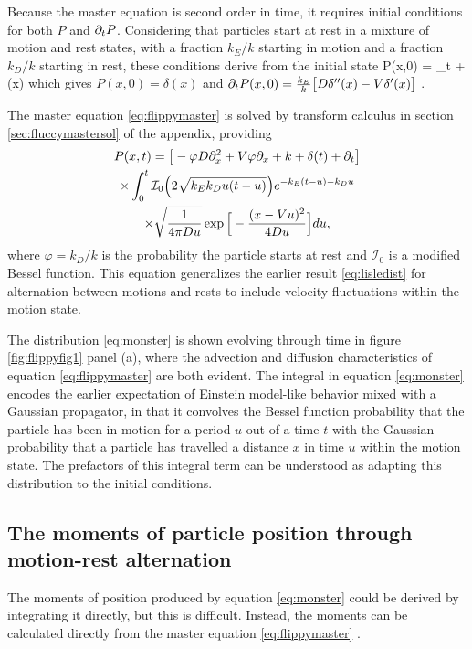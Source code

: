Because the master equation is second order in time, it requires initial conditions for both $P$ and $\partial_t P$. Considering that particles start at rest in a mixture of motion and rest states, with a fraction $k_E/k$ starting in motion and a fraction $k_D/k$ starting in rest, these conditions derive from the initial state 
\be P(x,0) = \lim_{t }   \exp{}+ \delta(x)\ee
which gives $P(x,0) = \delta(x)$ and $ \partial_t P(x,0) = \frac{k_E}{k}\big[D\delta''(x)-V \delta'(x) \big]$ \citep[c.f.][]{Weiss2002a}.

The master equation \ref{eq:flippymaster} is solved by transform calculus in section \ref{sec:fluccymastersol} of the appendix, providing
\begin{multline} P(x,t) = \big[-\varphi D\partial_x^2 + V\varphi \partial_x + k + \delta(t) +  \partial_t \big]\\
	\times \int_0^t \mathcal{I}_0\Big( 2 \sqrt{k_Ek_D u(t-u)}\Big) e^{-k_E(t-u)-k_D u} \\ \times \sqrt{ \frac{1}{4\pi D u}} \exp\Big[- \frac{(x-Vu)^2}{4Du}\Big] du, \label{eq:monster}
 \end{multline}
where $\varphi=k_D/k$ is the probability the particle starts at rest and $\mathcal{I}_0$ is a modified Bessel function. This equation generalizes the earlier result  \ref{eq:lisledist} for alternation between motions and rests to include velocity fluctuations within the motion state.

The distribution \ref{eq:monster} is shown evolving through time in figure \ref{fig:flippyfig1} panel (a), where the advection and diffusion characteristics of equation \ref{eq:flippymaster} are both evident. The integral in equation \ref{eq:monster} encodes the earlier expectation of Einstein model-like behavior mixed with a Gaussian propagator, in that it convolves the Bessel function probability that the particle has been in motion for a period $u$ out of a time $t$ with the Gaussian probability that a particle has travelled a distance $x$ in time $u$ within the motion state. The prefactors of this integral term can be understood as adapting this distribution to the initial conditions.

\subsection{The moments of particle position through motion-rest alternation}
The moments of position produced by equation \ref{eq:monster} could be derived by integrating it directly, but this is difficult. Instead, the moments can be calculated directly from the master equation \ref{eq:flippymaster} \citep{Cox1965}. 

